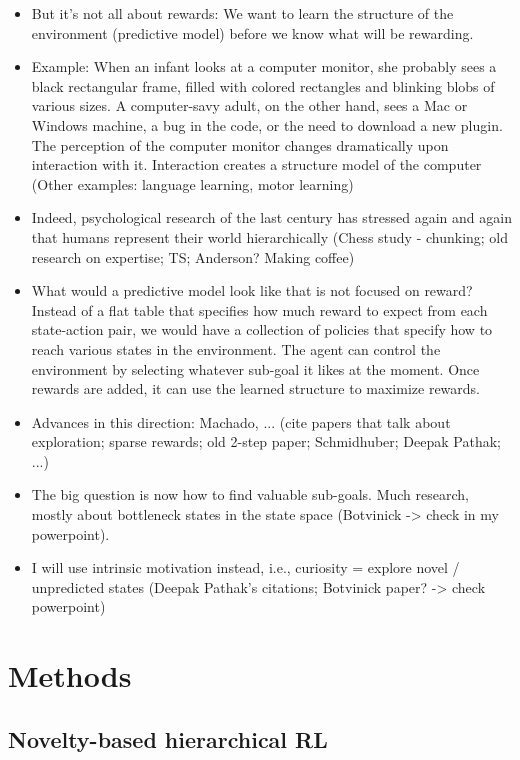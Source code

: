 \documentclass{article}
\begin{document}
\begin{itemize}
	\item But it's not all about rewards: We want to learn the structure of the environment (predictive model) before we know what will be rewarding.
	\item Example: When an infant looks at a computer monitor, she probably sees a black rectangular frame, filled with colored rectangles and blinking blobs of various sizes. A computer-savy adult, on the other hand, sees a Mac or Windows machine, a bug in the code, or the need to download a new plugin. The perception of the computer monitor changes dramatically upon interaction with it. Interaction creates a structure model of the computer (Other examples: language learning, motor learning)
	\item Indeed, psychological research of the last century has stressed again and again that humans represent their world hierarchically (Chess study - chunking; old research on expertise; TS; Anderson? Making coffee)
	\item What would a predictive model look like that is not focused on reward? Instead of a flat table that specifies how much reward to expect from each state-action pair, we would have a collection of policies that specify how to reach various states in the environment. The agent can control the environment by selecting whatever sub-goal it likes at the moment. Once rewards are added, it can use the learned structure to maximize rewards. 
	\item Advances in this direction: Machado, ... (cite papers that talk about exploration; sparse rewards; old 2-step paper; Schmidhuber; Deepak Pathak; ...)
	\item The big question is now how to find valuable sub-goals. Much research, mostly about bottleneck states in the state space (Botvinick -> check in my powerpoint).
	\item I will use intrinsic motivation instead, i.e., curiosity = explore novel / unpredicted states (Deepak Pathak's citations; Botvinick paper? -> check powerpoint)
\end{itemize}


\section{Methods}

\subsection{Novelty-based hierarchical RL}
\end{document}
